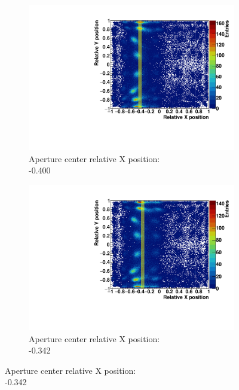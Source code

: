 \begin{figure}
\centering
\begin{subfigure}[t]{0.32\textwidth}
\centering
\includegraphics[width=\textwidth]{03_GraphicFiles/chapter3_CLaRySproto/Absorber/images_scan/line_1mm/run00014_floodMap.pdf}
\caption{Aperture center relative X position: \\ -0.400}
\label{chap3::fig::scan_map1_1mm}
\end{subfigure}
\begin{subfigure}[t]{0.32\textwidth}
\centering
\includegraphics[width=\textwidth]{03_GraphicFiles/chapter3_CLaRySproto/Absorber/images_scan/line_1mm/run00015_floodMap.pdf}
\caption{Aperture center relative X position: \\ -0.342}
\label{chap3::fig::scan_map2_1mm}
\end{subfigure}

\end{figure}
